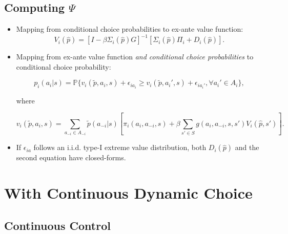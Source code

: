 \documentclass[]{book}
\begin{document}
\subsection{\texorpdfstring{Computing
\(\Psi\)}{Computing \textbackslash{}Psi}}\label{computing-psi}

\begin{itemize}
\item
  Mapping from conditional choice probabilities to ex-ante value
  function: \[
  V_i(\hat{p}) = [I - \beta \Sigma_i(\hat{p})G]^{-1} [\Sigma_i(\hat{p})\Pi_i + D_i(\hat{p})].
  \]
\item
  Mapping from ex-ante value function
  \textit{and conditional choice probabilities} to conditional choice
  probability:

  \begin{equation}
  p_i(a_i|s) =  \mathbb{P}\{v_i(\tilde{p}, a_i, s) + \epsilon_{ia_i} \ge  v_i(\tilde{p}, a_i', s) + \epsilon_{ia_i'}, \forall a_i' \in A_i\},
  \end{equation}

  where

  \begin{equation}
  v_i(\tilde{p}, a_i, s) = \sum_{a_{-i} \in A_{-i}} \tilde{p}(a_{-i}|s) [\pi_i(a_i, a_{-i}, s) + \beta \sum_{s' \in S} g(a_i, a_{-i}, s, s') V_i(\hat{p}, s')].
  \end{equation}
\item
  If \(\epsilon_{ia}\) follows an i.i.d. type-I extreme value
  distribution, both \(D_i(\hat{p})\) and the second equation have
  closed-forms.
\end{itemize}

\section{With Continuous Dynamic
Choice}\label{with-continuous-dynamic-choice}

\subsection{Continuous Control}\label{continuous-control}
\end{document}
